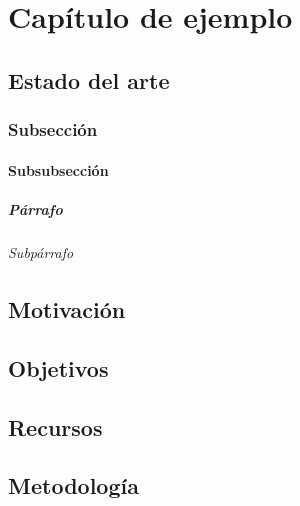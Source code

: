 \chapter{Capítulo de ejemplo}

\section{Estado del arte}
\subsection{Subsección}
\subsubsection{Subsubsección}
\paragraph{Párrafo}
\subparagraph{Subpárrafo}

\section{Motivación}

\section{Objetivos}

\section{Recursos}

\section{Metodología}